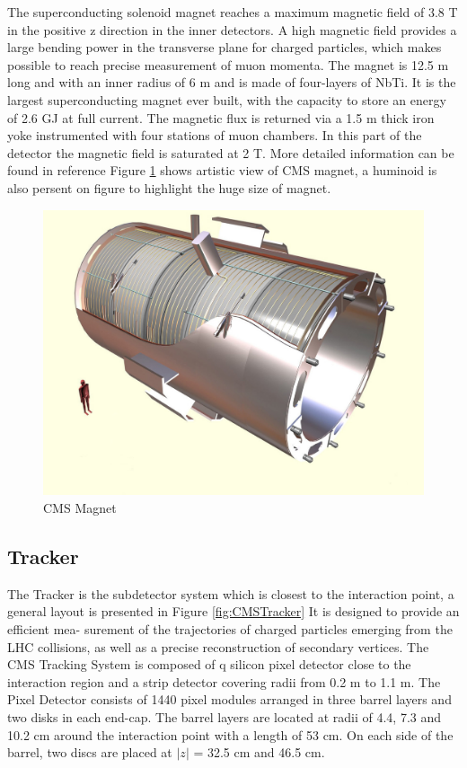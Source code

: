 The superconducting solenoid magnet reaches a maximum magnetic field of 3.8 
T in the positive z direction in the inner detectors. A high magnetic field provides 
a large bending power in the transverse plane for charged particles, which makes 
possible to reach precise measurement of muon momenta. The magnet is 12.5 m long 
and with an inner radius of 6 m and is made of four-layers of NbTi. It is the largest 
superconducting magnet ever built, with the capacity to store an energy of 2.6 GJ at 
full current. The magnetic flux is returned via a 1.5 m thick iron yoke instrumented 
with four stations of muon chambers. In this part of the detector the magnetic field 
is saturated at 2 T. More detailed information can be found in reference \cite{CMSMagnet} 
Figure \ref{fig:CMSMagnet} shows artistic view of CMS magnet, a huminoid is also persent
on figure to highlight the huge size of magnet.
\begin{figure}
  \includegraphics[width=\largefigwidth]{chap_CMSDetector_figures/cms_magnet}
  \caption[CMS Magnet artistic view]%
  {CMS Magnet }
  \label{fig:CMSMagnet}
\end{figure}



\subsection{Tracker}

The Tracker is the subdetector system which is closest to the interaction point, 
a general layout is presented in Figure \ref{fig:CMSTracker} It is designed to provide an efficient mea- 
surement of the trajectories of charged particles emerging from the LHC collisions, as 
well as a precise reconstruction of secondary vertices. The CMS Tracking System is 
composed of q silicon pixel detector close to the interaction region and a strip detector 
covering radii from 0.2 m to 1.1 m. The Pixel Detector consists of 1440 pixel modules 
arranged in three barrel layers and two disks in each end-cap. The barrel layers are 
located at radii of 4.4, 7.3 and 10.2 cm around the interaction point with a length of 
53 cm. On each side of the barrel, two discs are placed at $|z|$ = 32.5 cm and 46.5 cm.

